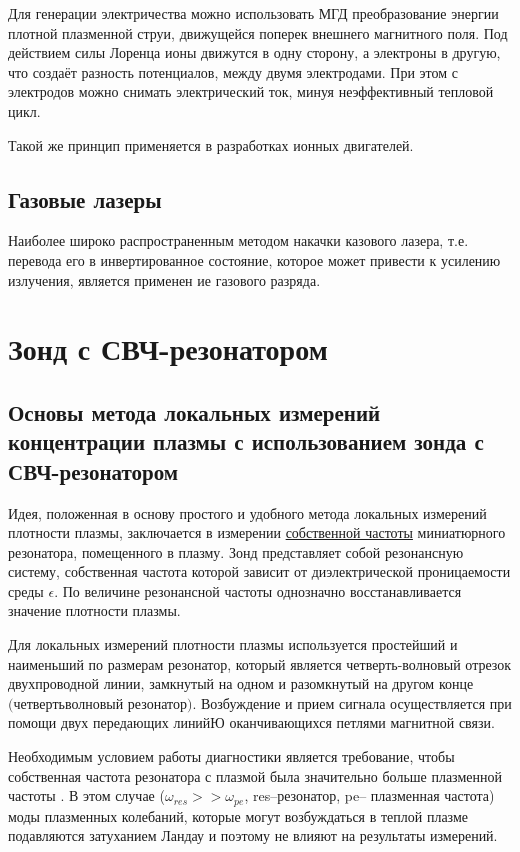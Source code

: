 Для генерации электричества можно использовать МГД преобразование энергии плотной плазменной струи, движущейся поперек внешнего магнитного поля. Под действием силы Лоренца ионы движутся в одну сторону, а электроны в другую, что создаёт разность потенциалов, между двумя электродами. При этом с электродов можно снимать электрический ток, минуя неэффективный тепловой цикл.

Такой же принцип применяется в разработках ионных двигателей.

\subsection{Газовые лазеры}

Наиболее широко распространенным методом накачки казового лазера, т.е. перевода его в инвертированное состояние, которое может привести к усилению излучения, является применен
ие газового разряда.
\section{Зонд с СВЧ-резонатором} %
\subsection{Основы метода локальных измерений концентрации плазмы с использованием зонда с СВЧ-резонатором}
Идея, положенная в основу простого и удобного метода локальных измерений плотности плазмы, заключается в измерении \underline{собственной частоты}
миниатюрного резонатора, помещенного в плазму. Зонд представляет собой резонансную систему, собственная частота которой зависит от диэлектрической проницаемости среды $\epsilon$. По величине резонансной частоты однозначно восстанавливается значение плотности плазмы.

Для локальных измерений плотности плазмы используется простейший и наименьший по размерам резонатор, который является четверть-волновый отрезок двухпроводной линии, замкнутый на одном и разомкнутый на другом конце  ${\text{(четвертьволновый резонатор)}}$. Возбуждение и прием сигнала осуществляется при помощи двух передающих линийЮ оканчивающихся петлями магнитной связи.

Необходимым условием работы диагностики является требование, чтобы собственная частота резонатора с плазмой была значительно больше плазменной частоты . В этом случае ($\omega_{res}>>\omega_{pe}$, res--резонатор, pe-- плазменная частота) моды плазменных колебаний, которые могут возбуждаться в теплой плазме подавляются затуханием Ландау и поэтому не влияют на результаты измерений.

